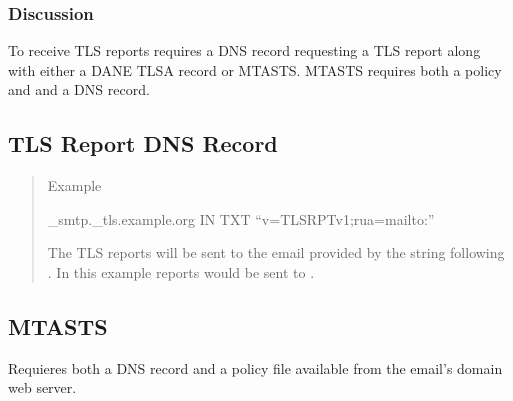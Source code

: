 \documentclass[letterpaper,10pt,english]{sphinxmanual}
\begin{document}
\begin{sphinxVerbatim}[commandchars=\\\{\}]
        
          
          
          
        
\end{sphinxVerbatim}


\subsubsection{Discussion}
\label{\detokenize{Readme-TLS:discussion}}
\sphinxAtStartPar
To receive TLS reports requires a DNS record requesting a TLS report along with
either a DANE TLSA record or MTA\sphinxhyphen{}STS. MTA\sphinxhyphen{}STS requires both a policy and
and a DNS record.


\subsection{TLS Report DNS Record}
\label{\detokenize{Readme-TLS:tls-report-dns-record}}\begin{quote}

\sphinxAtStartPar
Example

\sphinxAtStartPar
\_smtp.\_tls.example.org IN TXT “v=TLSRPTv1;rua=mailto:”

\sphinxAtStartPar
The TLS reports will be sent to the email provided by the string following .
In this example reports would be sent to .
\end{quote}


\subsection{MTA\sphinxhyphen{}STS}
\label{\detokenize{Readme-TLS:mta-sts}}
\sphinxAtStartPar
Requieres both a DNS record and a policy file available from the email’s domain web server.
\end{document}
